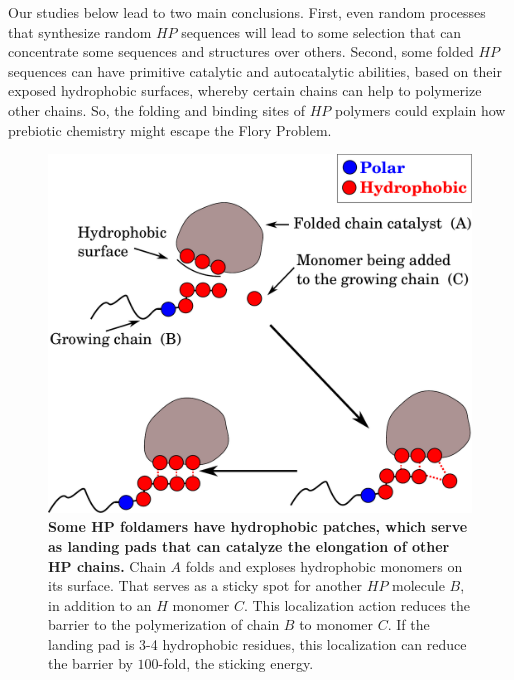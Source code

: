 \documentclass[journal=jacsat,manuscript=article,layout=twocolumn]{achemso}
\begin{document}
Our studies 
below lead to two main conclusions.  First, even random processes that synthesize random $HP$ 
sequences will lead to some selection that can concentrate some sequences and structures over 
others.  Second, some folded $HP$ sequences can have primitive catalytic and autocatalytic 
abilities, based on their exposed hydrophobic surfaces, whereby certain chains can help to 
polymerize other chains.  So, the folding and binding sites of $HP$ polymers could explain how 
prebiotic chemistry might escape the Flory Problem.
   
   \begin{figure}[h!]
  \centering
  \includegraphics[width=0.9\columnwidth]{pictures/hp-catalysis.pdf} 
  \caption{\footnotesize{\textbf{Some HP foldamers have hydrophobic patches, which serve as 
landing pads that can catalyze the elongation of other HP chains.}  Chain $A$ folds and exploses 
hydrophobic monomers on its surface.
 That serves as a sticky spot for another $HP$ molecule $B$, in addition to an $H$ monomer $C$.  
This localization action reduces the barrier to the polymerization of chain $B$ to monomer $C$.  If 
the landing pad is 3-4 hydrophobic residues, this localization can reduce the barrier by 
$100$-fold, the sticking energy.}}
  \label{fig:hp-catalysis}
\end{figure} 
\end{document}
